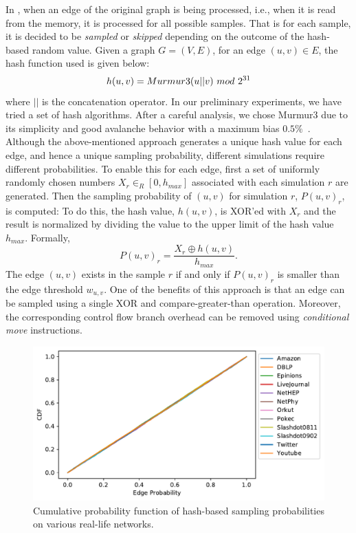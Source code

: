 \documentclass[10pt,journal,compsoc]{IEEEtran}
\newcommand\acro{{\sc{HyperFuseR\xspace}\xspace}\xspace}
\begin{document}
In \acro, when an edge of the original graph is being processed, i.e., when it is read from the memory, it is processed for all possible samples. That is for each sample, it is decided to be {\it sampled} or {\it skipped} depending on the outcome of the hash-based random value. Given a graph $G = (V, E)$, for an edge $(u, v) \in E$, the hash function used is given below:
\begin{equation}
    \label{eq:hash}
    h(u,v) = \mbox{{\sc Murmur3}}(u||v)~mod~2^{31}  
\end{equation}
where $||$ is the concatenation operator. In our preliminary experiments, we have tried a set of hash algorithms. After a careful analysis, we chose {{\sc Murmur3}} due to its simplicity and good avalanche behavior with a maximum bias $0.5\%$~\cite{MurmurHash3Performance}. Although the above-mentioned approach generates a unique hash value for each edge, and hence a unique sampling probability, different simulations require different probabilities. To enable this for each edge, first a set of uniformly randomly chosen numbers $X_r \in_R [0, h_{max}]$ associated with each simulation $r$ are generated. Then the sampling probability of $(u, v)$ for simulation $r$, $P(u, v)_r$, is computed: To do this, the hash value, $h(u,v)$, is XOR'ed with  $X_r$ and the result is normalized by dividing the value to the upper limit of the hash value $h_{max}$. Formally,
\begin{equation}
    \label{eq:hash_prob}
    P(u,v)_r = \frac{X_r \oplus h(u,v)}{h_{max}}.
\end{equation}
The edge $(u,v)$ exists in the sample $r$ if and only if  ${P}(u,v)_r$ is smaller than the edge threshold $w_{u,v}$. One of the benefits of this approach is that an edge can be sampled using a single XOR and compare-greater-than operation. Moreover, the corresponding control flow branch overhead can be removed using {\em conditional move} instructions. 



\begin{figure}[!ht] 
    \centering
    \includegraphics[width=1\linewidth]{./images/CDF.pdf}
    \caption{Cumulative probability function of hash-based sampling probabilities on various real-life networks.}
    \label{fig:prob-cdf} 
\end{figure}
\end{document}
